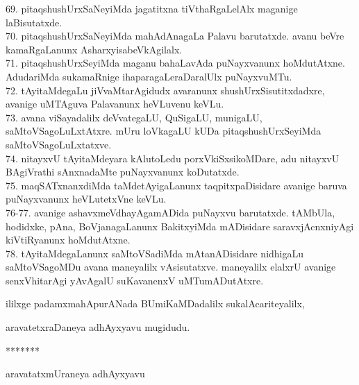 \documentclass{article}
\begin{document}
69. pitaqshushUrxSaNeyiMda jagatitxna tiVthaRgaLelAlx maganige laBisutatxde.\\
70. pitaqshushUrxSaNeyiMda mahAdAnagaLa Palavu barutatxde. avanu beVre kamaRgaLanunx AsharxyisabeVkAgilalx.\\
71. pitaqshushUrxSeyiMda maganu bahaLavAda puNayxvanunx hoMdutAtxne. AdudariMda sukamaRnige ihaparagaLeraDaralUlx puNayxvuMTu.\\
72. tAyitaMdegaLu jiVvaMtarAgidudx avaranunx shushUrxSisutitxdadxre, avanige uMTAguva Palavanunx heVLuvenu keVLu.\\
73. avana viSayadalilx deVvategaLU, QuSigaLU, munigaLU, saMtoVSagoLuLxtAtxre. mUru loVkagaLU kUDa pitaqshushUrxSeyiMda saMtoVSagoLuLxtatxve.\\
74. nitayxvU tAyitaMdeyara kAlutoLedu porxVkiSxsikoMDare, adu nitayxvU BAgiVrathi sAnxnadaMte puNayxvanunx koDutatxde.\\
75. maqSATxnanxdiMda taMdetAyigaLanunx taqpitxpaDisidare avanige baruva puNayxvanunx heVLutetxVne keVLu.\\
76-77. avanige ashavxmeVdhayAgamADida puNayxvu barutatxde. tAMbUla, hodidxke, pAna, BoVjanagaLanunx BakitxyiMda mADisidare saravxjAcnxniyAgi kiVtiRyanunx hoMdutAtxne.\\
78. tAyitaMdegaLanunx saMtoVSadiMda mAtanADisidare nidhigaLu saMtoVSagoMDu avana maneyalilx vAsisutatxve. maneyalilx elalxrU avanige senxVhitarAgi yAvAgalU suKavanenxV uMTumADutAtxre.\\

\begin{center}
ililxge padamxmahApurANada BUmiKaMDadalilx sukalAcariteyalilx,
\end{center}

\begin{center}
aravatetxraDaneya adhAyxyavu mugidudu.
\end{center}

\begin{center}
*******
\end{center}

\begin{center}
aravatatxmUraneya adhAyxyavu
\end{center}
\end{document}
